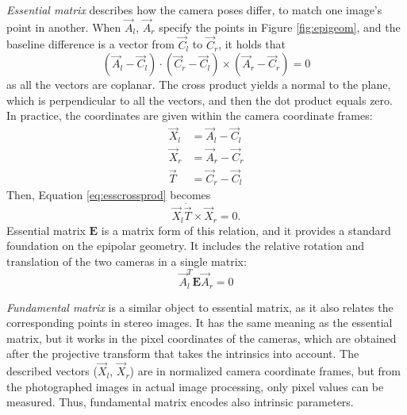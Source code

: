 \emph{Essential matrix} \cite{hartley03multiview} describes how the camera poses differ, to match one image's point in another.
When $\vec A_l$, $\vec A_r$ specify the points in Figure \ref{fig:epigeom}, and the baseline difference is a vector from $\vec C_l$ to $\vec C_r$, it holds that
\begin{equation} \label{eq:esscrossprod}
	(\vec A_l-\vec C_l) \cdot (\vec C_r - \vec C_l) \times (\vec A_r-\vec C_r) = 0
\end{equation}
as all the vectors are coplanar.
The cross product yields a normal to the plane, which is perpendicular to all the vectors, and then the dot product equals zero.
In practice, the coordinates are given within the camera coordinate frames:
\begin{align*}
	\vec X_l &= \vec A_l - \vec C_l\\
	\vec X_r &= \vec A_r - \vec C_r\\
	\vec T &= \vec C_r - \vec C_l
\end{align*}
Then, Equation \ref{eq:esscrossprod} becomes
\begin{equation}
	\vec X_l \dot \vec T \times \vec X_r = 0.
\end{equation}
Essential matrix $\bm E$ is a matrix form of this relation, and it provides a standard foundation on the epipolar geometry.
It includes the relative rotation and translation of the two cameras in a single matrix:
\begin{equation} \label{eq:essential}
	\vec A_l^T \bm E \vec A_r = 0
\end{equation}



\emph{Fundamental matrix} \cite[ch. 11]{hartley03multiview} is a similar object to essential matrix, as it also relates the corresponding points in stereo images.
It has the same meaning as the essential matrix, but it works in the pixel coordinates of the cameras, which are obtained after the projective transform that takes the intrinsics into account.
The described vectors ($\vec X_l$, $\vec X_r$) are in normalized camera coordinate frames, but from the photographed images in actual image processing, only pixel values can be measured.
Thus, fundamental matrix encodes also intrinsic parameters.

